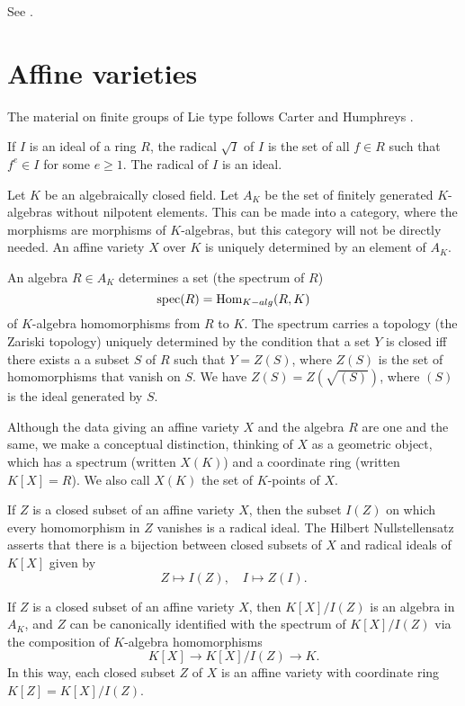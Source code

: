 See \cite{wilson2009finite}.  

\section{Affine varieties}


The material on finite groups of Lie type follows Carter
\cite{carter1985finite} and Humphreys \cite{humphreys2012linear}.

If $I$ is an ideal of a ring $R$, the radical $\sqrt{I}$ of $I$ is the
set of all $f \in R$ such that $f^e \in I$ for some $e\ge 1$.  The
radical of $I$ is an ideal.

Let $K$ be an algebraically closed field.  Let $A_K$ be the set of
finitely generated $K$-algebras without nilpotent elements.  This can
be made into a category, where the morphisms are morphisms of
$K$-algebras, but this category will not be directly needed.  An
affine variety $X$ over $K$ is uniquely determined by an element of
$A_K$.

An algebra $R\in A_K$ determines a set (the spectrum of $R$)
\[
\text{spec}(R) = \text{Hom}_{K-alg}(R,K)
\]
of $K$-algebra homomorphisms from $R$ to $K$.  The spectrum carries a
topology (the Zariski topology) uniquely determined by the condition
that a set $Y$ is closed iff there exists a a subset $S$ of $R$ such
that $Y=Z(S)$, where $Z(S)$ is the set of homomorphisms that vanish on
$S$.  We have $Z(S) = Z(\sqrt{(S)})$, where $(S)$ is the ideal
generated by $S$.

Although the data giving an affine variety $X$ and the algebra $R$ are
one and the same, we make a conceptual distinction, thinking of $X$ as
a geometric object, which has a spectrum (written $X(K)$) and a
coordinate ring (written $K[X]=R$).  We also call $X(K)$ the set of
$K$-points of $X$.

If $Z$ is a closed subset of an affine variety $X$, then the subset
$I(Z)$ on which every homomorphism in $Z$ vanishes is a radical ideal.
The Hilbert Nullstellensatz asserts that there is a bijection between
closed subsets of $X$ and radical ideals of $K[X]$ given by
\[
Z \mapsto I(Z),\quad I\mapsto Z(I).
\]

If $Z$ is a closed subset of an affine variety $X$, then $K[X]/I(Z)$
is an algebra in $A_K$, and $Z$ can be canonically identified with the
spectrum of $K[X]/I(Z)$ via the composition of $K$-algebra
homomorphisms
\[
K[X] \to K[X]/I(Z) \to K.
\]
In this way, each closed subset $Z$ of $X$ is an affine variety with
coordinate ring $K[Z] = K[X]/I(Z)$.

